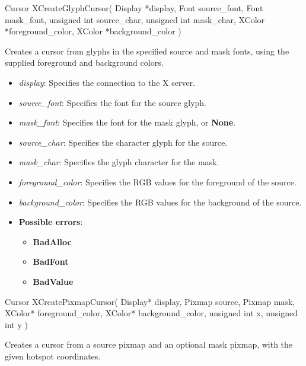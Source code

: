 \documentclass{report}
\begin{document}
\begin{itemize}
            \begin{cppcode}
                Cursor XCreateGlyphCursor(
                    Display *display,
                    Font source_font,
                    Font mask_font,
                    unsigned int source_char,
                    unsigned int mask_char,
                    XColor *foreground_color,
                    XColor *background_color
                )
            \end{cppcode}
            \bigbreak \noindent
            Creates a cursor from glyphs in the specified source and mask fonts, using the supplied foreground and background colors.

            \begin{itemize}
                \item \textit{display}: Specifies the connection to the X server.
                \item \textit{source\_font}: Specifies the font for the source glyph.
                \item \textit{mask\_font}: Specifies the font for the mask glyph, or \textbf{None}.
                \item \textit{source\_char}: Specifies the character glyph for the source.
                \item \textit{mask\_char}: Specifies the glyph character for the mask.
                \item \textit{foreground\_color}: Specifies the RGB values for the foreground of the source.
                \item \textit{background\_color}: Specifies the RGB values for the background of the source.
            \end{itemize}

            \begin{itemize}
                \item \textbf{Possible errors}:
                    \begin{itemize}
                        \item \textbf{BadAlloc}
                        \item \textbf{BadFont}
                        \item \textbf{BadValue}
                    \end{itemize}
            \end{itemize}

            \begin{cppcode}
                Cursor XCreatePixmapCursor(
                    Display* display,
                    Pixmap source,
                    Pixmap mask,
                    XColor* foreground_color,
                    XColor* background_color,
                    unsigned int x,
                    unsigned int y
                )
            \end{cppcode}
            \bigbreak \noindent
            Creates a cursor from a source pixmap and an optional mask pixmap, with the given hotspot coordinates.


\end{itemize}
\end{document}
